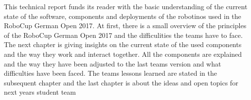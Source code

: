 This technical report funds its reader with the basic understanding of the current state of the software, components and deployments of the robotinos used in the RoboCup German Open 2017. At first, there is a small overview of the principles of the RoboCup German Open 2017 and the difficulities the teams have to face. The next chapter is giving insights on the current state of the used components and the way they work and interact together. All the components are explained and the way they have been adjusted to the last teams version and what difficulties have been faced. The teams lessons learned are stated in the subsequent chapter and the last chapter is about the ideas and open topics for next years student team